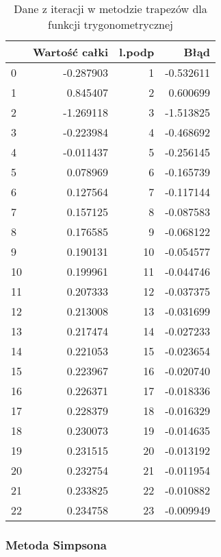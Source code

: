 \documentclass[12pt,twoside]{article}
\begin{document}
\begin{table}[H]
\centering 
\caption{Dane z iteracji w metodzie trapezów dla funkcji trygonometrycznej}
\label{tabela2.2}
\begin{tabular}{lrrr}
\toprule
{} &  Wartość całki &  l.podp &      Błąd \\
\midrule
0  &      -0.287903 &       1 & -0.532611 \\
1  &       0.845407 &       2 &  0.600699 \\
2  &      -1.269118 &       3 & -1.513825 \\
3  &      -0.223984 &       4 & -0.468692 \\
4  &      -0.011437 &       5 & -0.256145 \\
5  &       0.078969 &       6 & -0.165739 \\
6  &       0.127564 &       7 & -0.117144 \\
7  &       0.157125 &       8 & -0.087583 \\
8  &       0.176585 &       9 & -0.068122 \\
9  &       0.190131 &      10 & -0.054577 \\
10 &       0.199961 &      11 & -0.044746 \\
11 &       0.207333 &      12 & -0.037375 \\
12 &       0.213008 &      13 & -0.031699 \\
13 &       0.217474 &      14 & -0.027233 \\
14 &       0.221053 &      15 & -0.023654 \\
15 &       0.223967 &      16 & -0.020740 \\
16 &       0.226371 &      17 & -0.018336 \\
17 &       0.228379 &      18 & -0.016329 \\
18 &       0.230073 &      19 & -0.014635 \\
19 &       0.231515 &      20 & -0.013192 \\
20 &       0.232754 &      21 & -0.011954 \\
21 &       0.233825 &      22 & -0.010882 \\
22 &       0.234758 &      23 & -0.009949 \\
\bottomrule
\end{tabular}
\end{table}


\subsubsection{Metoda Simpsona}
\end{document}
